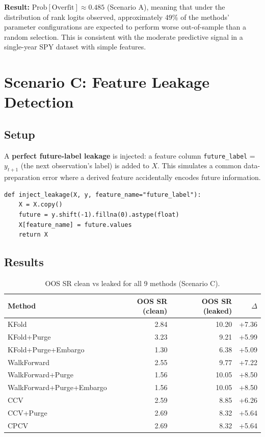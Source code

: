\documentclass[11pt,a4paper]{article}
\newcommand{\PBO}{\mathrm{Prob[Overfit]}}
\begin{document}
\textbf{Result:} $\PBO \approx 0.485$ (Scenario A), meaning that under the
distribution of rank logits observed, approximately 49\% of the methods'
parameter configurations are expected to perform worse out-of-sample than a
random selection.  This is consistent with the moderate predictive signal in
a single-year SPY dataset with simple features.

\section{Scenario C: Feature Leakage Detection}

\subsection{Setup}

A \textbf{perfect future-label leakage} is injected: a feature column
\texttt{future\_label} = $y_{t+1}$ (the next observation's label) is added to
$X$.  This simulates a common data-preparation error where a derived feature
accidentally encodes future information.

\begin{lstlisting}
def inject_leakage(X, y, feature_name="future_label"):
    X = X.copy()
    future = y.shift(-1).fillna(0).astype(float)
    X[feature_name] = future.values
    return X
\end{lstlisting}

\subsection{Results}

\begin{table}[H]
\centering
\caption{OOS SR clean vs leaked for all 9 methods (Scenario C).}
\begin{tabular}{lrrr}
\toprule
Method & OOS SR (clean) & OOS SR (leaked) & $\Delta$ \\
\midrule
KFold                     & 2.84  & 10.20 & +7.36 \\
KFold+Purge               & 3.23  &  9.21 & +5.99 \\
KFold+Purge+Embargo       & 1.30  &  6.38 & +5.09 \\
WalkForward               & 2.55  &  9.77 & +7.22 \\
WalkForward+Purge         & 1.56  & 10.05 & +8.50 \\
WalkForward+Purge+Embargo & 1.56  & 10.05 & +8.50 \\
CCV                       & 2.59  &  8.85 & +6.26 \\
CCV+Purge                 & 2.69  &  8.32 & +5.64 \\
CPCV                      & 2.69  &  8.32 & +5.64 \\
\bottomrule
\end{tabular}
\end{table}
\end{document}
